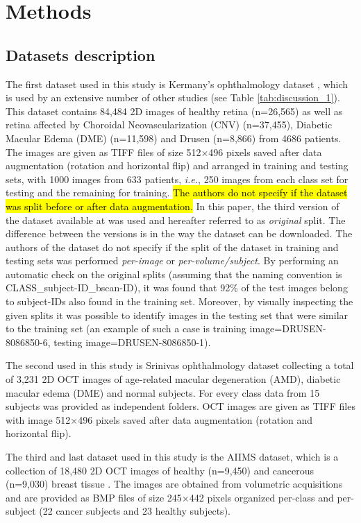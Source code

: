\documentclass[fleqn,10pt]{wlscirep}
\begin{document}
\section*{Methods}
\subsection*{Datasets description}
The first dataset used in this study is Kermany's ophthalmology dataset \cite{kermany2018large, kermany2018identifying}, which is used by an extensive number of other studies (see Table \ref{tab:discussion_1}). This dataset contains 84,484 2D images of healthy retina (n=26,565) as well as retina affected by Choroidal Neovascularization (CNV) (n=37,455), Diabetic Macular Edema (DME) (n=11,598) and Drusen (n=8,866) from 4686 patients. The images are given as TIFF files of size 512$\times$496 pixels saved after data augmentation (rotation and horizontal flip) and arranged in training and testing sets, with 1000 images from 633 patients, \textit{i.e.}, 250 images from each class set for testing and the remaining for training.  \hl{The authors do not specify if the dataset was split before or after data augmentation. }In this paper, the third version of the dataset available at \cite{kermany2018large} was used and hereafter referred to as \textit{original} split. The difference between the versions is in the way the dataset can be downloaded. The authors of the dataset \cite{kermany2018large} do not specify if the split of the dataset in training and testing sets was performed \textit{per-image} or \textit{per-volume/subject}. By performing an automatic check on the original splits (assuming that the naming convention is CLASS\_subject-ID\_bscan-ID), it was found that 92\% of the test images belong to subject-IDs also found in the training set. Moreover, by visually inspecting the given splits it was possible to identify images in the testing set that were similar to the training set (an example of such a case is training image=DRUSEN-8086850-6, testing image=DRUSEN-8086850-1).

The second used in this study is Srinivas ophthalmology dataset \cite{srinivasan2014fully} collecting a total of 3,231 2D OCT images of age-related macular degeneration (AMD),  diabetic macular edema (DME) and normal subjects.  For every class data from 15 subjects was provided as independent folders. OCT images are given as TIFF files with image 512$\times$496 pixels saved after data augmentation (rotation and horizontal flip).

The third and last dataset used in this study is the AIIMS dataset, which is a collection of 18,480 2D OCT images of healthy (n=9,450) and cancerous (n=9,030) breast tissue \cite{butola2019volumetric}. The images are obtained from volumetric acquisitions and are provided as BMP files of size 245$\times$442 pixels organized per-class and per-subject (22 cancer subjects and 23 healthy subjects). 
\end{document}
